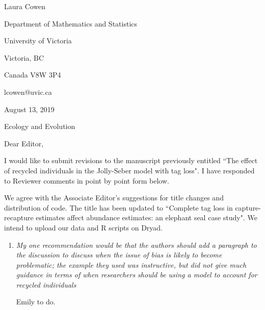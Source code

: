 \documentclass[12pt]{article}
\begin{document}
\setlength{\textheight}{575pt} \setlength{\baselineskip}{23pt}

\noindent\tiny Laura Cowen

\noindent Department of Mathematics and Statistics

\noindent University of Victoria

\noindent Victoria, BC

\noindent Canada V8W 3P4

\noindent lcowen@uvic.ca

\bigskip

\bigskip

\noindent \normalsize August 13, 2019
\bigskip





\noindent Ecology and Evolution


\bigskip


\bigskip
\noindent Dear Editor,

\bigskip

I would like to submit revisions to the manuscript previously entitled ``The effect of recycled individuals in the Jolly-Seber model with tag loss".  I have responded to Reviewer comments in point by point form below. 

\bigskip


We agree with the Associate Editor's suggestions for title changes and distribution of code. The title has been updated to ``Complete tag loss in capture-recapture estimates affect abundance estimates: an elephant seal case study". We intend to upload our data and R scripts on Dryad. 

\bigskip

\begin{enumerate}
\item  {\it My one recommendation would be that the authors should add a paragraph to the discussion to discuss when the issue of bias is likely to become problematic;  the example they used was instructive,  but did not give much guidance in terms of when researchers should be using a model to account for recycled individuals}

Emily to do.

\end{enumerate}
\end{document}
